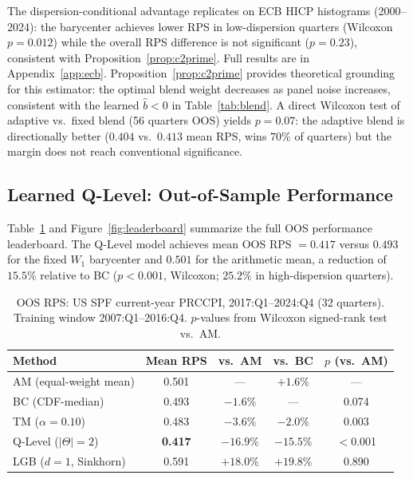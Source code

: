 The dispersion-conditional advantage replicates on ECB HICP histograms (2000--2024): the
barycenter achieves lower RPS in low-dispersion quarters (Wilcoxon $p=0.012$) while the
overall RPS difference is not significant ($p=0.23$), consistent with Proposition~\ref{prop:c2prime}.
Full results are in Appendix~\ref{app:ecb}.
Proposition~\ref{prop:c2prime} provides theoretical grounding for this estimator: the optimal
blend weight decreases as panel noise increases, consistent with the learned $\hat{b} < 0$ in
Table~\ref{tab:blend}.  A direct Wilcoxon test of adaptive vs.\ fixed blend (56 quarters OOS)
yields $p = 0.07$: the adaptive blend is directionally better ($0.404$ vs.\ $0.413$ mean RPS,
wins $70\%$ of quarters) but the margin does not reach conventional significance.

\subsection{Learned Q-Level: Out-of-Sample Performance}
\label{sec:learned}
\label{sec:lgb_spf}

Table~\ref{tab:thread3_oos} and Figure~\ref{fig:leaderboard} summarize the full OOS performance leaderboard.
The Q-Level model achieves mean OOS RPS $= 0.417$ versus $0.493$ for the fixed $W_1$ barycenter
and $0.501$ for the arithmetic mean, a reduction of $\mathbf{15.5\%}$ relative to BC
($p < 0.001$, Wilcoxon; $25.2\%$ in high-dispersion quarters).

\begin{table}[ht]
\centering
\caption{OOS RPS: US SPF current-year PRCCPI, 2017:Q1--2024:Q4 (32 quarters).
  Training window 2007:Q1--2016:Q4.  $p$-values from Wilcoxon signed-rank test vs.\ AM.}
\label{tab:thread3_oos}
\begin{tabular}{lcccc}
\hline
Method & Mean RPS & vs.\ AM & vs.\ BC & $p$ (vs.\ AM) \\
\hline
AM (equal-weight mean)     & 0.501 & ---      & $+1.6\%$  & ---   \\
BC (CDF-median)            & 0.493 & $-1.6\%$ & ---       & 0.074 \\
TM ($\alpha=0.10$)         & 0.483 & $-3.6\%$ & $-2.0\%$  & 0.003 \\
Q-Level ($|\Theta|=2$)     & \textbf{0.417} & $-16.9\%$ & $-15.5\%$ & $<$0.001 \\
LGB ($d=1$, Sinkhorn)      & 0.591 & $+18.0\%$ & $+19.8\%$ & 0.890 \\
\hline
\end{tabular}
\end{table}

